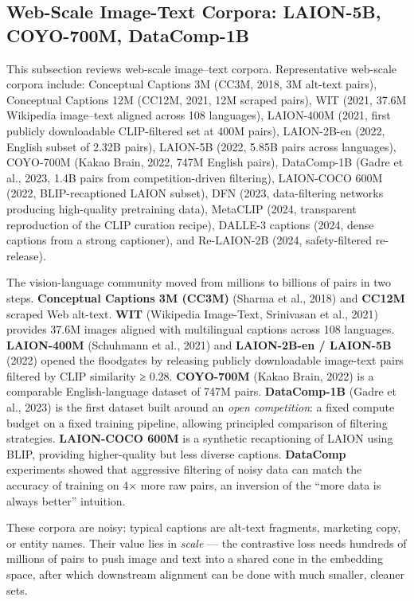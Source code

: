 \documentclass{article}
\begin{document}
\subsection{Web-Scale Image-Text Corpora: LAION-5B, COYO-700M, DataComp-1B}\label{web-scale-image-text-corpora-laion-5b-coyo-700m-datacomp-1b}

This subsection reviews web-scale image--text corpora. Representative web-scale corpora include: Conceptual Captions 3M (CC3M, 2018, 3M alt-text pairs), Conceptual Captions 12M (CC12M, 2021, 12M scraped pairs), WIT (2021, 37.6M Wikipedia image--text aligned across 108 languages), LAION-400M (2021, first publicly downloadable CLIP-filtered set at 400M pairs), LAION-2B-en (2022, English subset of 2.32B pairs), LAION-5B (2022, 5.85B pairs across languages), COYO-700M (Kakao Brain, 2022, 747M English pairs), DataComp-1B (Gadre et al., 2023, 1.4B pairs from competition-driven filtering), LAION-COCO 600M (2022, BLIP-recaptioned LAION subset), DFN (2023, data-filtering networks producing high-quality pretraining data), MetaCLIP (2024, transparent reproduction of the CLIP curation recipe), DALLE-3 captions (2024, dense captions from a strong captioner), and Re-LAION-2B (2024, safety-filtered re-release).

The vision-language community moved from millions to billions of pairs in two steps. \textbf{Conceptual Captions 3M (CC3M)} (Sharma et al., 2018) and \textbf{CC12M} scraped Web alt-text. \textbf{WIT} (Wikipedia Image-Text, Srinivasan et al., 2021) provides 37.6M images aligned with multilingual captions across 108 languages. \textbf{LAION-400M} (Schuhmann et al., 2021) and \textbf{LAION-2B-en / LAION-5B} (2022) opened the floodgates by releasing publicly downloadable image-text pairs filtered by CLIP similarity ≥ 0.28. \textbf{COYO-700M} (Kakao Brain, 2022) is a comparable English-language dataset of 747M pairs. \textbf{DataComp-1B} (Gadre et al., 2023) is the first dataset built around an \emph{open competition}: a fixed compute budget on a fixed training pipeline, allowing principled comparison of filtering strategies. \textbf{LAION-COCO 600M} is a synthetic recaptioning of LAION using BLIP, providing higher-quality but less diverse captions. \textbf{DataComp} experiments showed that aggressive filtering of noisy data can match the accuracy of training on 4× more raw pairs, an inversion of the ``more data is always better'' intuition.

These corpora are noisy: typical captions are alt-text fragments, marketing copy, or entity names. Their value lies in \emph{scale} --- the contrastive loss needs hundreds of millions of pairs to push image and text into a shared cone in the embedding space, after which downstream alignment can be done with much smaller, cleaner sets.
\end{document}
